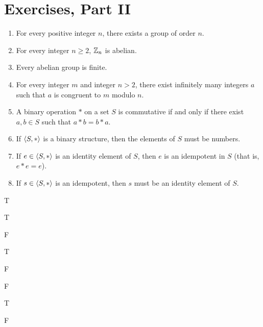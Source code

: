 \pagebreak
\section{Exercises, Part II}

\begin{exercise}[ID=2A]
\tf

\begin{enumerate}
\item For every positive integer $n$, there exists a group of order $n$.

\item For every integer $n\geq 2$, $\mathbb{Z}_n$ is abelian.

\item Every abelian group is finite.

\item For every integer $m$ and integer $n>2$, there exist infinitely many integers $a$ such that $a$ is congruent to $m$ modulo $n$.

\item A binary operation $*$ on a set $S$ is commutative if and only if there exist $a,b\in S$ such that $a*b=b*a$.

\item If $\langle S, *\rangle$ is a binary structure, then the elements of $S$ must be numbers.

\item If $e\in \langle S,*\rangle$ is an identity element of $S$, then $e$ is an idempotent in $S$ (that is, $e*e=e$).

\item If $s\in \langle S,*\rangle$ is an idempotent, then $s$ must be an identity element of $S$.
\end{enumerate}
\end{exercise}

\begin{solution}[print=true]


\noindent
\begin{inparaenum}[(a)]
\item T \hfill \item T  \hfill \item  F  \hfill \item T  \hfill \item F  \hfill \item F  \hfill \item T   \hfill\item F
\end{inparaenum}

\end{solution}


